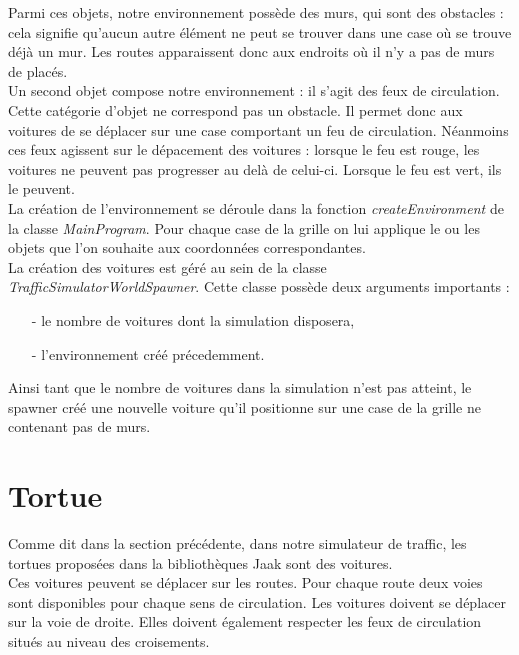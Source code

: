\documentclass[a4paper,12pt]{report}
\begin{document}
Parmi ces objets, notre environnement possède des murs, qui sont des obstacles : cela signifie qu'aucun autre élément ne peut se trouver dans une case où se trouve déjà un mur. Les routes apparaissent donc aux endroits où il n'y a pas de murs de placés. \\

Un second objet compose notre environnement : il s'agit des feux de circulation. Cette catégorie d'objet ne correspond pas un obstacle. Il permet donc aux voitures de se déplacer sur une case comportant un feu de circulation. Néanmoins ces feux agissent sur le dépacement des voitures : lorsque le feu est rouge, les voitures ne peuvent pas progresser au delà de celui-ci. Lorsque le feu est vert, ils le peuvent. \\

La création de l'environnement se déroule dans la fonction \emph{createEnvironment} de la classe \emph{MainProgram}. Pour chaque case de la grille on lui applique le ou les objets que l'on souhaite aux coordonnées correspondantes. \\

La création des voitures est géré au sein de la classe \emph{TrafficSimulatorWorldSpawner}. Cette classe possède deux arguments importants : 
\begin{itemize}
\item[-] le nombre de voitures dont la simulation disposera,
\item[-] l'environnement créé précedemment.
\end{itemize}

Ainsi tant que le nombre de voitures dans la simulation n'est pas atteint, le spawner créé une nouvelle voiture qu'il positionne sur une case de la grille ne contenant pas de murs.

\section{Tortue}

Comme dit dans la section précédente, dans notre simulateur de traffic, les tortues proposées dans la bibliothèques Jaak sont des voitures. \\

Ces voitures peuvent se déplacer sur les routes. Pour chaque route deux voies sont disponibles pour chaque sens de circulation. Les voitures doivent se déplacer sur la voie de droite. Elles doivent également respecter les feux de circulation situés au niveau des croisements. \\
\end{document}
